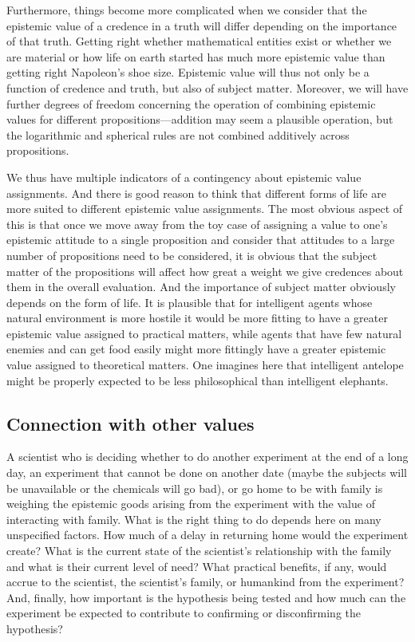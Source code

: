 Furthermore, things become more complicated when we consider that the epistemic value of a credence in a truth will
differ depending on the importance of that truth. Getting right whether mathematical entities exist or whether we are 
material or how life on earth started has much more epistemic value than getting right Napoleon's shoe size. Epistemic
value will thus not only be a function of credence and truth, but also of subject matter. Moreover, we will have 
further degrees of freedom concerning the operation of combining epistemic values for different propositions---addition
may seem a plausible operation, but the logarithmic and spherical rules are not combined additively across propositions.

We thus have multiple indicators of a contingency about epistemic value assignments. And there is good reason to think
that different forms of life are more suited to different epistemic value assignments. The most obvious aspect of this
is that once we move away from the toy case of assigning a value to one's epistemic attitude to a single proposition
and consider that attitudes to a large number of propositions need to be considered, it is obvious that the subject
matter of the propositions will affect how great a weight we give credences about them in the overall evaluation. And
the importance of subject matter obviously depends on the form of life. It is plausible that for intelligent agents whose
natural environment is more hostile it would be more fitting to have a greater epistemic 
value assigned to practical matters, while agents that have few natural enemies and can get food easily might more fittingly
have a greater epistemic value assigned to theoretical matters. One imagines here that intelligent antelope might be
properly expected to be less philosophical than intelligent elephants.

\subsection{Connection with other values}
A scientist who is deciding whether to do another experiment at the end of a long day, an experiment that 
cannot be done on another date (maybe the subjects will be unavailable or the chemicals will go bad), or go home to 
be with family is weighing the epistemic goods arising from the experiment with the value of interacting
with family. What is the right thing to do depends here on many unspecified factors. How much of a delay
in returning home would the experiment create? What is the current state of the scientist's relationship 
with the family and what is their current level of need? What
practical benefits, if any, would accrue to the scientist, the scientist's family, or humankind from the
experiment? And, finally, how important is the hypothesis being tested and 
how much can the experiment be expected to contribute to confirming or disconfirming the hypothesis? 

